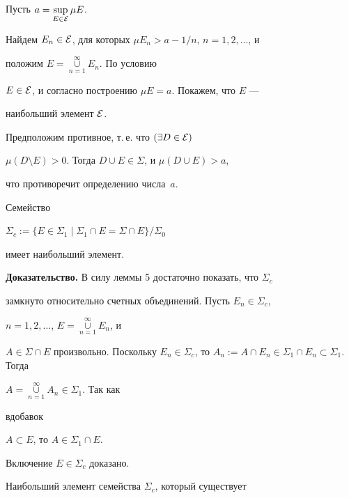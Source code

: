 \begin{pf} Пусть $a=\sup\limits_{E\in{\cal E}}\mu E$.


Найдем $E_n\in{\cal E}$, для которых $\mu E_n>a-1/n$, $n=1,2,\dotsc$, и


положим $E=\mathop{\cup}\limits_{n=1}^\infty E_n$. По условию


$E\in{\cal E}$, и согласно построению $\mu E=a$. Покажем, что $E$ ---


наибольший элемент $\cal E$.





Предположим противное, т.\,е. что $(\exists D\in{\cal E})$


$\mu(D\setminus E)>0$. Тогда $D\cup E\in\Sigma$, и $\mu(D\cup E)>a$,


что противоречит определению числа~$a$.


\end{pf}





\begin{lem}


Семейство


$\Sigma_c:=\{E\in\Sigma_1\mid \Sigma_1\cap E=\Sigma\cap E\}/\Sigma_0$


имеет наибольший элемент.


\end{lem}





{\bf Доказательство.} В силу леммы 5 достаточно показать, что $\Sigma_c$


замкнуто относительно счетных объединений. Пусть $E_n\in\Sigma_c$,


$n=1,2,\dotsc$, $E=\mathop{\cup}\limits_{n=1}^\infty E_n$, и


$A\in\Sigma\cap E$ произвольно. Поскольку $E_n\in\Sigma_c$, то $A_n:=


A\cap E_n\in\Sigma_1\cap E_n\subset\Sigma_1$. Тогда


$A=\mathop{\cup}\limits_{n=1}^\infty A_n\in\Sigma_1$. Так как


вдобавок


$A\subset E$, то  $A\in\Sigma_1\cap E$.


Включение $E\in\Sigma_c$ доказано.







Наибольший элемент семейства $\Sigma_c$, который существует


